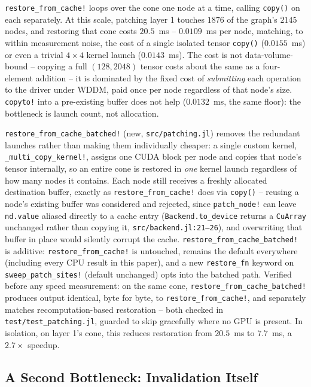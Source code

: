 \documentclass{article}
\begin{document}
\texttt{restore\_from\_cache!} loops over the cone one node at a time, calling \texttt{copy()} on
each separately. At this scale, patching layer 1 touches $1876$ of the graph's $2145$ nodes,
and restoring that cone costs $20.5$~ms -- $0.0109$~ms per node, matching, to within measurement
noise, the cost of a single isolated tensor \texttt{copy()} ($0.0155$~ms) or even a trivial
$4{\times}4$ kernel launch ($0.0143$~ms). The cost is not data-volume-bound -- copying a full
$(128,2048)$ tensor costs about the same as a four-element addition -- it is dominated by the fixed
cost of \emph{submitting} each operation to the driver under WDDM, paid once per node regardless of
that node's size. \texttt{copyto!} into a pre-existing buffer does not help ($0.0132$~ms, the same
floor): the bottleneck is launch count, not allocation.

\texttt{restore\_from\_cache\_batched!} (new, \texttt{src/patching.jl}) removes the redundant
launches rather than making them individually cheaper: a single custom kernel,
\texttt{\_multi\_copy\_kernel!}, assigns one CUDA block per node and copies that node's tensor
internally, so an entire cone is restored in \emph{one} kernel launch regardless of how many nodes
it contains. Each node still receives a freshly allocated destination buffer, exactly as
\texttt{restore\_from\_cache!} does via \texttt{copy()} -- reusing a node's existing buffer was
considered and rejected, since \texttt{patch\_node!} can leave \texttt{nd.value} aliased directly
to a cache entry (\texttt{Backend.to\_device} returns a \texttt{CuArray} unchanged rather than
copying it, \texttt{src/backend.jl:21--26}), and overwriting that buffer in place would silently
corrupt the cache. \texttt{restore\_from\_cache\_batched!} is additive: \texttt{restore\_from\_cache!}
is untouched, remains the default everywhere (including every CPU result in this paper), and a new
\texttt{restore\_fn} keyword on \texttt{sweep\_patch\_sites!} (default unchanged) opts into the
batched path. Verified before any speed measurement: on the same cone, \texttt{restore\_from\_cache\_batched!}
produces output identical, byte for byte, to \texttt{restore\_from\_cache!}, and separately matches
recomputation-based restoration -- both checked in \texttt{test/test\_patching.jl}, guarded to skip
gracefully where no GPU is present. In isolation, on layer 1's cone, this reduces restoration from
$20.5$~ms to $7.7$~ms, a $2.7\times$ speedup.

\subsection{A Second Bottleneck: Invalidation Itself}
\label{sec:consumersindex}
\end{document}
